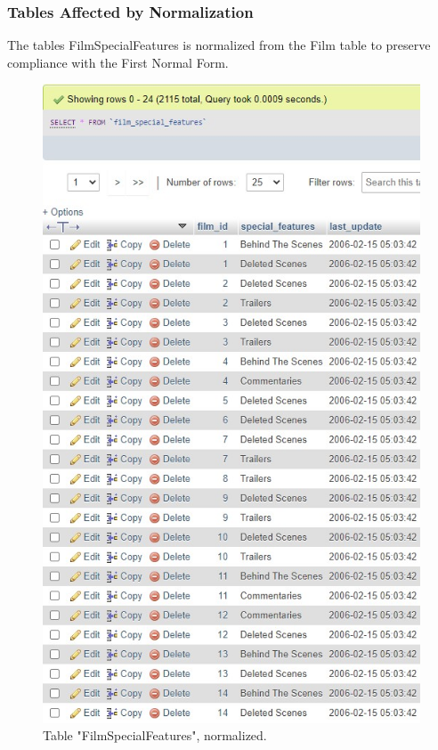 \documentclass[openany]{article}
\begin{document}
	\subsubsection{Tables Affected by Normalization}
		The tables Film\textunderscore Special\textunderscore Features is normalized from the Film table to preserve compliance with the First Normal Form. 
		\begin{figure}[H]
			\includegraphics[height = \textheight]{table_filmspecialfeatures_norm}
			\caption{Table "Film\textunderscore Special\textunderscore Features", normalized.}
		\end{figure}
\end{document}
